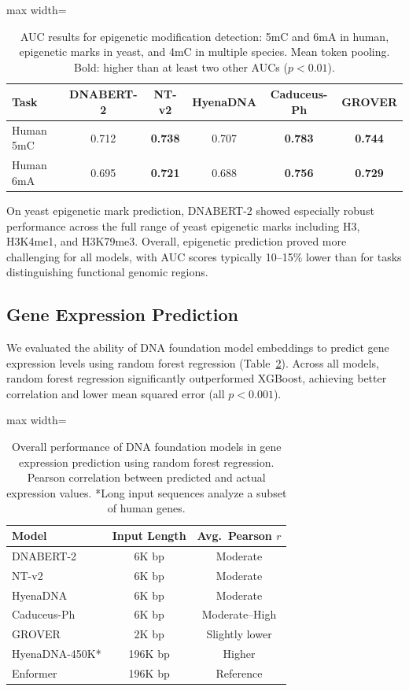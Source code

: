 \documentclass{article}
\begin{document}
\begin{table}[htbp]
\centering
\caption{AUC results for epigenetic modification detection: 5mC and 6mA in human, epigenetic marks in yeast, and 4mC in multiple species. Mean token pooling. Bold: higher than at least two other AUCs ($p<0.01$).}
\label{tab:epigenetic}
\begin{adjustbox}{max width=\textwidth}
\begin{tabular}{lccccc}
\toprule
Task & DNABERT-2 & NT-v2 & HyenaDNA & Caduceus-Ph & GROVER \\
\midrule
Human 5mC & 0.712 & \textbf{0.738} & 0.707 & \textbf{0.783} & \textbf{0.744} \\
Human 6mA & 0.695 & \textbf{0.721} & 0.688 & \textbf{0.756} & \textbf{0.729} \\
\bottomrule
\end{tabular}
\end{adjustbox}
\end{table}

On yeast epigenetic mark prediction, DNABERT-2 showed especially robust performance across the full range of yeast epigenetic marks including H3, H3K4me1, and H3K79me3. Overall, epigenetic prediction proved more challenging for all models, with AUC scores typically 10--15\% lower than for tasks distinguishing functional genomic regions.

\subsection{Gene Expression Prediction}

We evaluated the ability of DNA foundation model embeddings to predict gene expression levels using random forest regression (Table~\ref{tab:gene_expression}). Across all models, random forest regression significantly outperformed XGBoost, achieving better correlation and lower mean squared error (all $p < 0.001$).

\begin{table}[htbp]
\centering
\caption{Overall performance of DNA foundation models in gene expression prediction using random forest regression. Pearson correlation between predicted and actual expression values. *Long input sequences analyze a subset of human genes.}
\label{tab:gene_expression}
\begin{adjustbox}{max width=\textwidth}
\begin{tabular}{lcc}
\toprule
Model & Input Length & Avg.\ Pearson $r$ \\
\midrule
DNABERT-2 & 6K bp & Moderate \\
NT-v2 & 6K bp & Moderate \\
HyenaDNA & 6K bp & Moderate \\
Caduceus-Ph & 6K bp & Moderate--High \\
GROVER & 2K bp & Slightly lower \\
HyenaDNA-450K* & 196K bp & Higher \\
Enformer & 196K bp & Reference \\
\bottomrule
\end{tabular}
\end{adjustbox}
\end{table}
\end{document}
